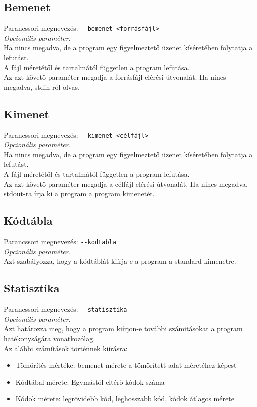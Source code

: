 \subsection{Bemenet}
\label{ssec:in}
Parancssori megnevezés: \texttt{-{}-bemenet <forrásfájl>} \\
{\it Opcionális paraméter.}\\
Ha nincs megadva, de a program egy figyelmeztető üzenet kíséretében folytatja a lefutást. \\
A fájl méretétől és tartalmától független a program lefutása. \\
Az azt követő paraméter megadja a forrásfájl elérési útvonalát. Ha nincs megadva, stdin-ról olvas.

\subsection{Kimenet}
\label{ssec:out}
Parancssori megnevezés: \texttt{-{}-kimenet <célfájl>} \\
{\it Opcionális paraméter.}\\
Ha nincs megadva, de a program egy figyelmeztető üzenet kíséretében folytatja a lefutást.\\
A fájl méretétől és tartalmától független a program lefutása. \\
Az azt követő paraméter megadja a célfájl elérési útvonalát. Ha nincs megadva, stdout-ra írja ki a program a program kimenetét.

\subsection{Kódtábla}
Parancssori megnevezés: \texttt{-{}-kodtabla} \\
{\it Opcionális paraméter.}\\
Azt szabályozza, hogy a kódtáblát kiírja-e a program a standard kimenetre.

\subsection{Statisztika}
Parancssori megnevezés: \texttt{-{}-statisztika} \\
{\it Opcionális paraméter.}\\
Azt határozza meg, hogy a program kiírjon-e további számitásokat a program hatékonyságára vonatkozólag.\\
Az alábbi számítások történnek kiírásra: \\
\begin{itemize}
    \item Tömörítés mértéke: bemenet mérete a tömörített adat méretéhez képest
    \item Kódtábal mérete: Egymástól eltérő kódok száma
    \item Kódok mérete: legrövidebb kód, leghosszabb kód, kódok átlagos mérete
\end{itemize}

